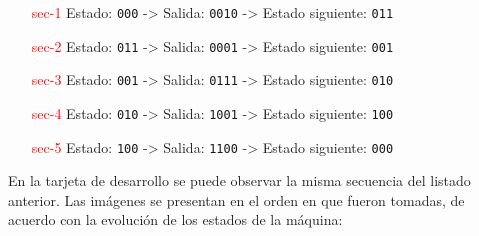 \documentclass[12pt, letterpaper]{article}
\begin{document}
\begin{enumerate}
    \item[\textcolor{red}{sec-1}] Estado: \texttt{000} -> Salida: \texttt{0010} -> Estado siguiente: \texttt{011}
    \item[\textcolor{red}{sec-2}] Estado: \texttt{011} -> Salida: \texttt{0001} -> Estado siguiente: \texttt{001}
    \item[\textcolor{red}{sec-3}] Estado: \texttt{001} -> Salida: \texttt{0111} -> Estado siguiente: \texttt{010}
    \item[\textcolor{red}{sec-4}] Estado: \texttt{010} -> Salida: \texttt{1001} -> Estado siguiente: \texttt{100}
    \item[\textcolor{red}{sec-5}] Estado: \texttt{100} -> Salida: \texttt{1100} -> Estado siguiente: \texttt{000}
\end{enumerate}

En la tarjeta de desarrollo se puede observar la misma secuencia del listado anterior. Las imágenes se presentan en el orden en que fueron tomadas, de acuerdo con la evolución de los estados de la máquina:
\end{document}
